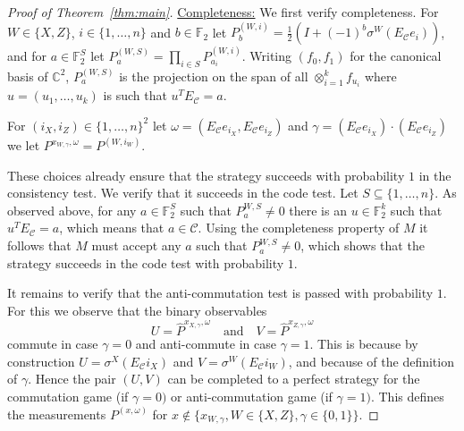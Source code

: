 \documentclass[11pt]{article}
\theoremstyle{definition}
\newcommand{\code}{\mathcal{C}}
\newcommand{\Id}{\ensuremath{I}}
\newcommand{\field}{\mathbb{F}_2}
\newcommand{\C}{\ensuremath{\mathbb{C}}}
\newcommand{\F}{\ensuremath{\mathbb{F}}}
\begin{document}
\begin{proof}[Proof of Theorem~\ref{thm:main}]
\underline{Completeness:} We first verify completeness. For $W\in\{X,Z\}$, $i\in\{1,\ldots,n\}$ and $b\in \F_2$ let $P^{(W,i)}_b = \frac{1}{2}(\Id + (-1)^b\sigma^W(E_\code e_i))$, and for $a\in \F_2^S$ let $P^{(W,S)}_a = \prod_{i\in S} P^{(W,i)}_{a_i}$. Writing $(f_0,f_1)$ for the canonical basis of $\C^2$, $P^{(W,S)}_a$ is the projection on the span of all $\otimes_{i=1}^k f_{u_i}$ where $u=(u_1,\ldots,u_k)$ is such that $u^T E_\code=a$.   

For $(i_X,i_Z)\in \{1,\ldots,n\}^2 $ let $\omega=(E_\code e_{i_X}, E_\code e_{i_Z})$ and $\gamma =(E_\code e_{i_X}) \cdot(E_\code e_{i_Z}) $ we let $P^{x_{W,\gamma},\omega} = P^{(W,i_W)}$. 

These choices already ensure that the strategy succeeds with probability $1$ in the consistency test. We verify that it succeeds in the code test. Let $S\subseteq\{1,\ldots,n\}$. As observed above, for any $a\in\field^S$ such that $P^{W,S}_a\neq 0$ there is an $u\in \field^k$ such that $u^TE_\code=a$, which means that $a\in \code$. 
Using the completeness property of $M$ it follows that $M$ must accept any $a$ such that $P^{W,S}_a\neq 0$, which shows that the strategy succeeds in the code test with probability $1$. 

It remains to verify that the anti-commutation test is passed with probability $1$. For this we observe that 
the binary observables 
\[ U=\widehat{ P}^{x_{X,\gamma},\omega} \quad\text{and}\quad V= \widehat{P}^{x_{Z,\gamma},\omega} \]
commute in case $\gamma=0$ and anti-commute in case $\gamma=1$. This is because by construction $U=\sigma^X(E_\code i_X)$ and $V=\sigma^W(E_\code i_W)$, and because of the definition of $\gamma$. Hence the pair $(U,V)$ can be completed to a perfect strategy for the commutation game (if $\gamma=0)$ or anti-commutation game (if $\gamma=1)$. This defines the measurements $P^{(x,\omega)}$ for $x\notin \{x_{W,\gamma},W\in\{X,Z\},\gamma\in\{0,1\}\}$. 

\bigskip 


\end{proof}
\end{document}
